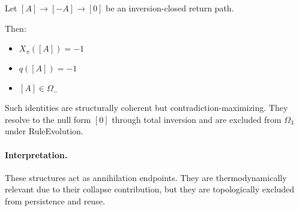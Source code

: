 Let $[A] \to [-A] \to [0]$ be an inversion-closed return path.

Then:
\begin{itemize}
    \item $X_\pi([A]) = -1$
    \item $q([A]) = -1$
    \item $[A] \in \Omega_-$
\end{itemize}

Such identities are structurally coherent but contradiction-maximizing. They resolve to the null form $[0]$ through total inversion and are excluded from $\Omega_3$ under RuleEvolution.

\paragraph{Interpretation.}
These structures act as annihilation endpoints. They are thermodynamically relevant due to their collapse contribution, but they are topologically excluded from persistence and reuse.
